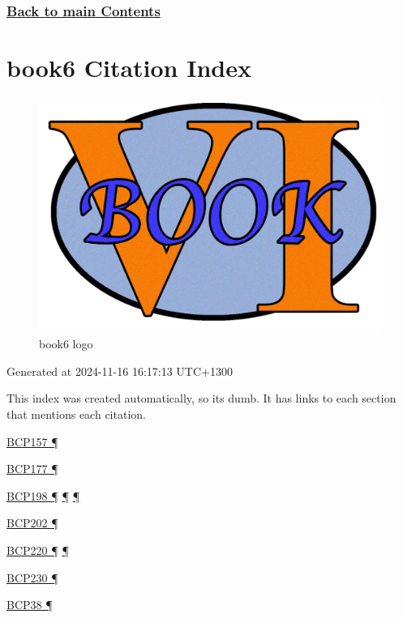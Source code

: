 \documentclass[
]{article}
\begin{document}
\subsubsection{\texorpdfstring{\hyperref[list-of-contents]{Back to main
Contents}}{Back to main Contents}}\label{back-to-main-contents-12}

\pagebreak

\section{book6 Citation Index}\label{book6-citation-index}

\begin{figure}
\centering
\includegraphics{book6logo.png}
\caption{book6 logo}
\end{figure}

Generated at 2024-11-16 16:17:13 UTC+1300

This index was created automatically, so it\textquotesingle s dumb. It
has links to each section that mentions each citation.

\hyperref[addresses]{BCP157 ¶}

\hyperref[coexistence-with-legacy-ipv4]{BCP177 ¶}

\hyperref[addresses]{BCP198 ¶} \hyperref[routing]{¶}
\hyperref[markdown-usage]{¶}

\hyperref[energy-consumption]{BCP202 ¶}

\hyperref[ipv6-basic-technology]{BCP220 ¶} \hyperref[further-reading]{¶}

\hyperref[extension-headers-and-options]{BCP230 ¶}

\hyperref[filtering]{BCP38 ¶}
\end{document}
